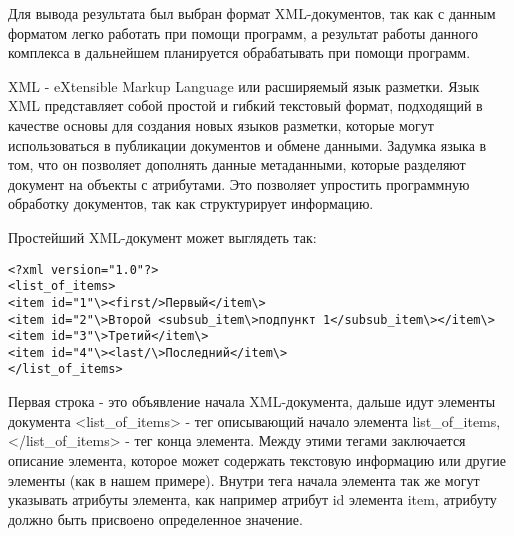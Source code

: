 Для вывода результата был выбран формат XML-документов, так как с данным форматом легко работать при помощи программ, а результат работы данного комплекса в дальнейшем планируется обрабатывать при помощи программ.

XML - eXtensible Markup Language или расширяемый язык разметки. Язык XML представляет собой простой и гибкий текстовый формат, подходящий в качестве основы для создания новых языков разметки, которые могут использоваться в публикации документов и обмене данными. \cite{xml} Задумка языка в том, что он позволяет дополнять данные метаданными, которые разделяют документ на объекты с атрибутами. Это позволяет упростить программную обработку документов, так как структурирует информацию.

Простейший XML-документ может выглядеть так:


\begin{verbatim}
<?xml version="1.0"?>
<list_of_items>
<item id="1"\><first/>Первый</item\>
<item id="2"\>Второй <subsub_item\>подпункт 1</subsub_item\></item\>
<item id="3"\>Третий</item\>
<item id="4"\><last/\>Последний</item\>
</list_of_items>
\end{verbatim}


Первая строка - это объявление начала XML-документа, дальше идут элементы документа <list\_of\_items> - тег описывающий начало элемента list\_of\_items, </list\_of\_items> - тег конца элемента. Между этими тегами заключается описание элемента, которое может содержать текстовую информацию или другие элементы (как в нашем примере). Внутри тега начала элемента так же могут указывать атрибуты элемента, как например атрибут id элемента item, атрибуту должно быть присвоено определенное значение.

